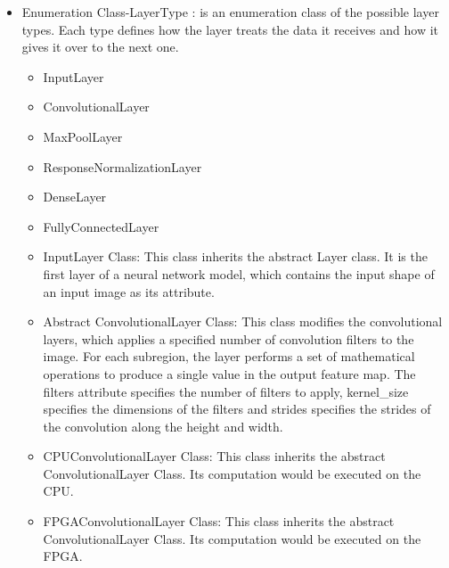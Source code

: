 \documentclass[parskip=full]{scrartcl}
\begin{document}
\pagebreak



\begin{itemize}
	\item Enumeration Class-LayerType : is an enumeration class of the possible layer types. Each type defines how the layer treats the data it receives and how it gives it over to the next one.
	\begin{itemize}
		\item InputLayer
		\item ConvolutionalLayer
		\item MaxPoolLayer
		\item ResponseNormalizationLayer
		\item DenseLayer
		\item FullyConnectedLayer
	\end{itemize}

\pagebreak

\begin{itemize}
	\item InputLayer Class: This class inherits the abstract Layer class. It is the first layer of a neural network model, which contains the input shape of an input image as its attribute.
	\item Abstract ConvolutionalLayer Class: This class modifies the convolutional layers, which applies a specified number of convolution filters to the image. For each subregion, the layer performs a set of mathematical operations to produce a single value in the output feature map. 
The filters attribute specifies the number of filters to apply, kernel\_size specifies the dimensions of the filters and strides specifies the strides of the convolution along the height and width.
	\item CPUConvolutionalLayer Class: This class inherits the abstract ConvolutionalLayer Class. Its computation would be executed on the CPU. 
	\item FPGAConvolutionalLayer Class: This class inherits the abstract ConvolutionalLayer Class. Its computation would be executed on the FPGA. 
\end{itemize}



\pagebreak




\end{itemize}
\end{document}
